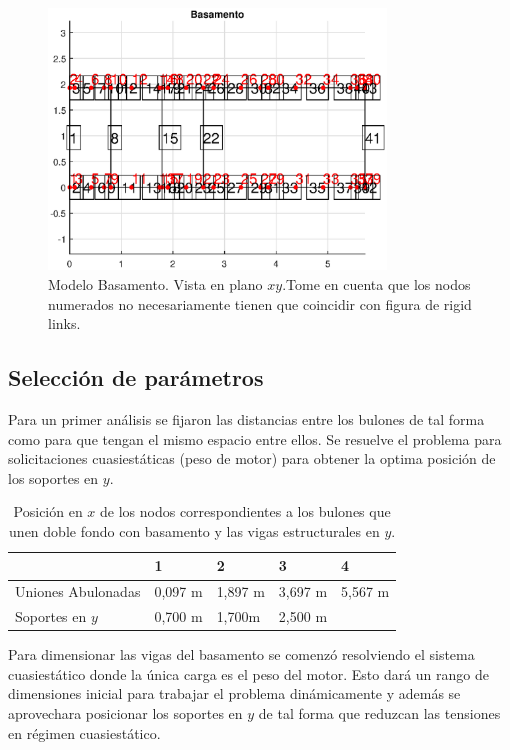 \documentclass[onecolumn,10pt,titlepage,a4paper]{article}
\begin{document}
\begin{figure}[htb!]
	\centering
	\includegraphics[width=0.8\textwidth]{fig/modelbasamento.eps}
	\caption{Modelo Basamento. Vista en plano $x\!y$.Tome en cuenta que los nodos numerados no necesariamente tienen que coincidir con figura de rigid links.}
	\label{fig:modelobasamento}
\end{figure}

\subsection*{Selección de parámetros}
Para un primer análisis se fijaron las distancias entre los bulones de tal forma como para que tengan el mismo espacio entre ellos. Se resuelve el problema para solicitaciones cuasiestáticas (peso de motor) para obtener la optima posición de los soportes en $y$.


\begin{table}[htb!]
	\centering
	\begin{tabular}{lllll}
		& 1 & 2 & 3 & 4 \\ \hline
		Uniones Abulonadas& 0,097 \si{\meter}  & 1,897 \si{ \meter} & 3,697 \si{ \meter} & 5,567 \si{ \meter} \\
		Soportes en $y$& 0,700 \si{\meter}  &1,700\si{\meter}   & 2,500 \si{\meter}  &  \\
	\end{tabular}
\caption{Posición en $x$ de los nodos correspondientes a los bulones que unen doble fondo con basamento y las vigas estructurales en $y$.}
\end{table}

Para dimensionar las vigas del basamento se comenzó resolviendo el sistema cuasiestático donde la única carga es el peso del motor. Esto dará un rango de dimensiones inicial para trabajar el problema dinámicamente y además se aprovechara posicionar los soportes en $y$ de tal forma que reduzcan las tensiones en régimen cuasiestático. 
\end{document}
